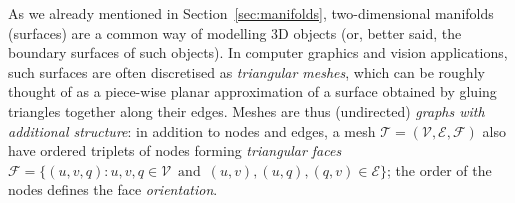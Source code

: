 As we already mentioned in Section~\ref{sec:manifolds}, two-dimensional manifolds (surfaces) are a common way of modelling 3D objects (or, better said, the boundary surfaces of such objects).  In computer graphics and vision applications, such surfaces are often discretised as {\em triangular meshes},  
which can be roughly thought of as a piece-wise planar approximation of a surface obtained by gluing triangles together along their edges. 
%
Meshes are thus (undirected) {\em graphs with additional structure}: in addition to nodes and edges, a mesh 
$\mathcal{T} = (\mathcal{V},\mathcal{E}, \mathcal{F})$ 
also have ordered triplets of nodes forming {\em triangular faces} $\mathcal{F} =  \{ (u,v,q) : u,v,q \in \mathcal{V} \,\,\, \text{and} \,\,\, (u,v), (u,q), (q,v) \in  \mathcal{E}\}$; the order of the nodes defines the face {\em orientation}. 
%


